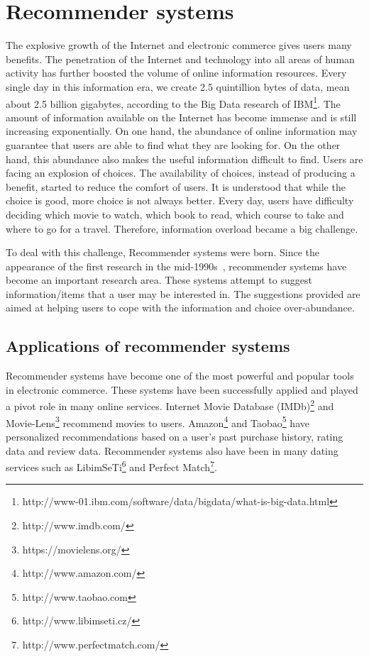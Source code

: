 \documentclass[oneside,13pt]{extreport}
\begin{document}
\section{Recommender systems}
The explosive growth  of the Internet and electronic commerce gives users many benefits. The penetration of the Internet and technology into all areas of human activity has further boosted the volume of online information resources. Every single day in this information era, we create 2.5 quintillion bytes of data, mean about 2.5 billion gigabytes, according to the Big Data research of IBM\footnote{http://www-01.ibm.com/software/data/bigdata/what-is-big-data.html}. The amount of information available on the Internet has become immense and is still increasing exponentially. On one hand, the abundance of online information may guarantee that users are able to find what they are looking for. On the other hand, this abundance also makes the useful information difficult to find. Users are facing an explosion of choices. The availability of choices, instead of producing a benefit, started to reduce the comfort of users. It is understood that while the choice is good, more choice is not always better. Every day, users have difficulty deciding which movie to watch, which book to read, which course to take and where to go for a travel. Therefore, information overload became a big challenge. 

To deal with this challenge, Recommender systems were born. Since the appearance of the first research in the mid-1990s~\cite{Hill, Resnick, Shardanand}, recommender systems have become an important research area. These systems attempt to suggest information/items that a user may be interested in. The suggestions provided are aimed at helping users to cope with the information and choice over-abundance. 

\subsection{Applications of recommender systems}
Recommender systems have become one of the most powerful and popular tools in electronic commerce. These systems have been successfully applied and played a pivot role in many online services.  Internet Movie Database (IMDb)\footnote{http://www.imdb.com/} and Movie-Lens\footnote{https://movielens.org/} recommend movies to users. Amazon\footnote{http://www.amazon.com/} and Taobao\footnote{http://www.taobao.com} have personalized recommendations based on a user’s past purchase history, rating data and review data. Recommender systems also have been  in many dating services such as LibimSeTi\footnote{http://www.libimseti.cz/} and Perfect Match\footnote{http://www.perfectmatch.com/}.
\end{document}
